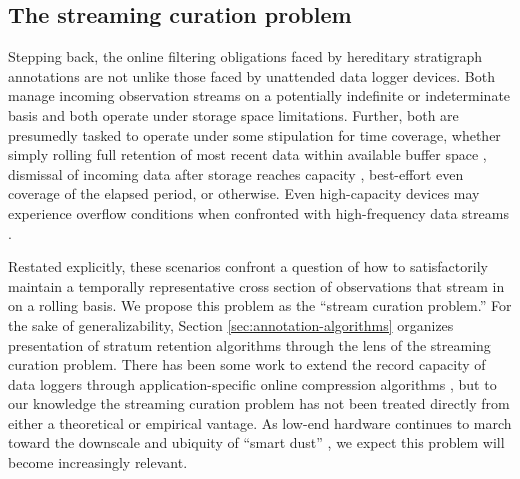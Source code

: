 \subsection{The streaming curation problem}

Stepping back, the online filtering obligations faced by hereditary stratigraph annotations are not unlike those faced by unattended data logger devices.
Both manage incoming observation streams on a potentially indefinite or indeterminate basis and both operate under storage space limitations.
Further, both are presumedly tasked to operate under some stipulation for time coverage, whether simply rolling full retention of most recent data within available buffer space \citep{fincham1995use}, dismissal of incoming data after storage reaches capacity \citep{saunders1989portable,mahzan2017design}, best-effort even coverage of the elapsed period, or otherwise.
Even high-capacity devices may experience overflow conditions when confronted with high-frequency data streams \citep{luharuka2003design}.

Restated explicitly, these scenarios confront a question of how to satisfactorily maintain a temporally representative cross section of observations that stream in on a rolling basis.
We propose this problem as the ``stream curation problem.''
For the sake of generalizability, Section \ref{sec:annotation-algorithms} organizes presentation of stratum retention algorithms through the lens of the streaming curation problem.
There has been some work to extend the record capacity of data loggers through application-specific online compression algorithms \citep{hadiatna2016design}, but to our knowledge the streaming curation problem has not been treated directly from either a theoretical or empirical vantage.
As low-end hardware continues to march toward the downscale and ubiquity of ``smart dust'' \citep{warneke2001smart}, we expect this problem will become increasingly relevant.


